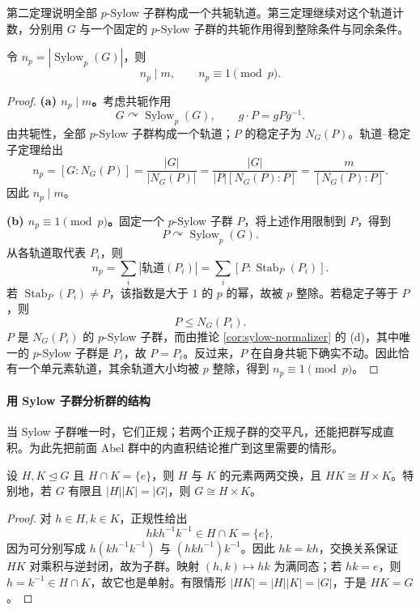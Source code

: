 \documentclass[lang=cn,a4paper,fontset=none,zihao=false,10pt,openany,twoside]{beautybook}
\numberwithin{algorithm}{chapter}
\begin{document}
第二定理说明全部 $p$-Sylow 子群构成一个共轭轨道。第三定理继续对这个轨道计数，分别用 $G$ 与一个固定的 $p$-Sylow 子群的共轭作用得到整除条件与同余条件。
\begin{theorem}\label{thm:sylow-number}
令 $n_p=|\operatorname{Sylow}_p(G)|$，则
\[
 n_p\mid m,\qquad n_p\equiv1\pmod p.
\]
\end{theorem}
\begin{proof}
\par\smallskip\noindent\textbf{(a) $n_p\mid m$。}\quad 考虑共轭作用
\[
 G\curvearrowright\operatorname{Sylow}_p(G),
 \qquad g\cdot P=gPg^{-1}.
\]
由共轭性，全部 $p$-Sylow 子群构成一个轨道；$P$ 的稳定子为 $N_G(P)$。轨道--稳定子定理给出
\[
 n_p=[G:N_G(P)]
     =\frac{|G|}{|N_G(P)|}
     =\frac{|G|}{|P|[N_G(P):P]}
     =\frac{m}{[N_G(P):P]}.
\]
因此 $n_p\mid m$。

\par\smallskip\noindent\textbf{(b) $n_p\equiv1\pmod p$。}\quad 固定一个 $p$-Sylow 子群 $P$，将上述作用限制到 $P$，得到
\[
 P\curvearrowright\operatorname{Sylow}_p(G).
\]
从各轨道取代表 $P_i$，则
\[
 n_p=\sum_i|\text{轨道}(P_i)|
     =\sum_i[P:\operatorname{Stab}_P(P_i)].
\]
若 $\operatorname{Stab}_P(P_i)\ne P$，该指数是大于 $1$ 的 $p$ 的幂，故被 $p$ 整除。若稳定子等于 $P$，则
\[
 P\le N_G(P_i).
\]
$P$ 是 $N_G(P_i)$ 的 $p$-Sylow 子群，而由推论 \ref{cor:sylow-normalizer} 的 (d)，其中唯一的 $p$-Sylow 子群是 $P_i$，故 $P=P_i$。反过来，$P$ 在自身共轭下确实不动。因此恰有一个单元素轨道，其余轨道大小均被 $p$ 整除，得到 $n_p\equiv1\pmod p$。
\end{proof}

\paragraph{用 Sylow 子群分析群的结构}
当 Sylow 子群唯一时，它们正规；若两个正规子群的交平凡，还能把群写成直积。为此先把前面 Abel 群中的内直积结论推广到这里需要的情形。
\begin{lemma}[两个正规子群的乘积]\label{lem:normal-internal-product}
设 $H,K\trianglelefteq G$ 且 $H\cap K=\{e\}$，则 $H$ 与 $K$ 的元素两两交换，且 $HK\cong H\times K$。特别地，若 $G$ 有限且 $|H||K|=|G|$，则 $G\cong H\times K$。
\end{lemma}
\begin{proof}
对 $h\in H,k\in K$，正规性给出
\[
 hkh^{-1}k^{-1}\in H\cap K=\{e\},
\]
因为可分别写成 $h(kh^{-1}k^{-1})$ 与 $(hkh^{-1})k^{-1}$。因此 $hk=kh$，交换关系保证 $HK$ 对乘积与逆封闭，故为子群。映射 $(h,k)\mapsto hk$ 为满同态；若 $hk=e$，则 $h=k^{-1}\in H\cap K$，故它也是单射。有限情形 $|HK|=|H||K|=|G|$，于是 $HK=G$。
\end{proof}
\end{document}
